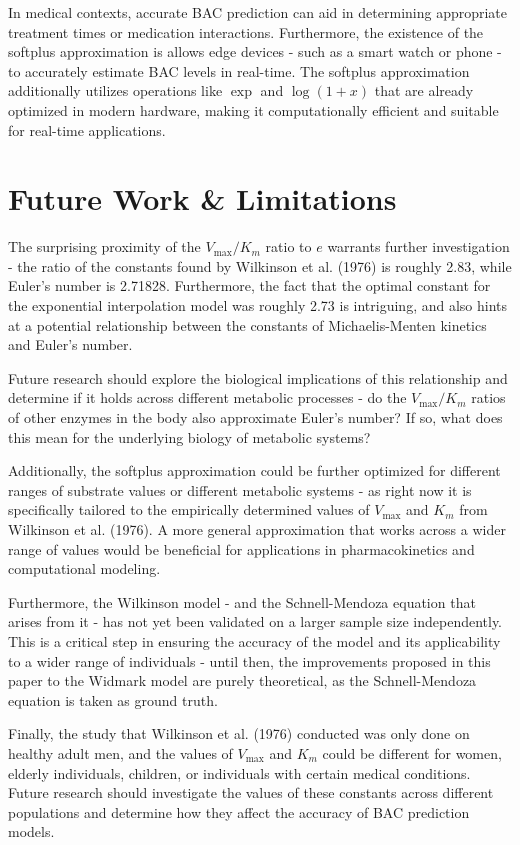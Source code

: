 \documentclass[12pt]{article}
\begin{document}
In medical contexts, accurate BAC prediction can aid in determining appropriate treatment times or medication interactions. Furthermore, the existence of the softplus approximation is allows  edge devices - such as a smart watch or phone - to accurately estimate BAC levels in real-time. The softplus approximation additionally utilizes operations like $\exp$ and $\log(1 + x)$ that are already optimized in modern hardware, making it computationally efficient and suitable for real-time applications.

\section{Future Work & Limitations}
The surprising proximity of the $V_{\text{max}}/K_m$ ratio to $e$ warrants further investigation - the ratio of the constants found by Wilkinson et al. (1976) is roughly 2.83, while Euler's number is 2.71828. Furthermore, the fact that the optimal constant for the exponential interpolation model was roughly 2.73 is intriguing, and also hints at a potential relationship between the constants of Michaelis-Menten kinetics and Euler's number.

Future research should explore the biological implications of this relationship and determine if it holds across different metabolic processes - do the $V_{\text{max}}/K_m$ ratios of other enzymes in the body also approximate Euler's number? If so, what does this mean for the underlying biology of metabolic systems?

Additionally, the softplus approximation could be further optimized for different ranges of substrate values or different metabolic systems - as right now it is specifically tailored to the empirically determined values of $V_{\text{max}}$ and $K_m$ from Wilkinson et al. (1976). A more general approximation that works across a wider range of values would be beneficial for applications in pharmacokinetics and computational modeling.

Furthermore, the Wilkinson model - and the Schnell-Mendoza equation that arises from it - has not yet been validated on a larger sample size independently. This is a critical step in ensuring the accuracy of the model and its applicability to a wider range of individuals - until then, the improvements proposed in this paper to the Widmark model are purely theoretical, as the Schnell-Mendoza equation is taken as ground truth.

Finally, the study that Wilkinson et al. (1976) conducted was only done on healthy adult men, and the values of $V_{\text{max}}$ and $K_m$ could be different for women, elderly individuals, children, or individuals with certain medical conditions. Future research should investigate the values of these constants across different populations and determine how they affect the accuracy of BAC prediction models.
\end{document}
